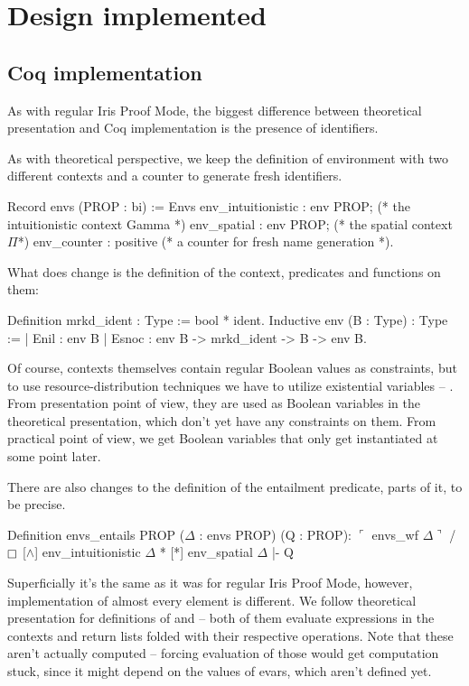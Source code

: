 {\section{Design implemented}

\subsection{Coq implementation}
\label{subsec:ipm_constr_coq_implementation}

As with regular Iris Proof Mode, the biggest difference between theoretical presentation and Coq implementation is the presence of identifiers.

As with theoretical perspective, we keep the definition of environment with two different contexts and a counter to generate fresh identifiers.
\begin{coq}
  Record envs (PROP : bi) := Envs {
    env_intuitionistic : env PROP; (* the intuitionistic context Gamma *)
    env_spatial : env PROP; (* the spatial context $\Pi$*)
    env_counter : positive (* a counter for fresh name generation *)}.
\end{coq}

What does change is the definition of the context, predicates and functions on them:
\begin{coq}
  Definition mrkd_ident : Type := bool * ident.
  Inductive env (B : Type) : Type :=
  | Enil : env B
  | Esnoc : env B -> mrkd_ident -> B -> env B.
\end{coq}

Of course, contexts themselves contain regular Boolean values as constraints, but to use resource-distribution techniques we have to utilize existential variables -- \citet[Section 2.2.1]{thecoqdevelopmentteamCoqProofAssistant2020}.
From presentation point of view, they are used as Boolean variables in the theoretical presentation, which don't yet have any constraints on them.
From practical point of view, we get Boolean variables that only get instantiated at some point later.

There are also changes to the definition of the entailment predicate, parts of it, to be precise.
\begin{coq}
  Definition envs_entails {PROP} ($\Delta$ : envs PROP) (Q : PROP):
  $\ulcorner$ envs_wf $\Delta \urcorner$ /\ $\intuit$ [$\wedge$] env_intuitionistic $\Delta$ * [*] env_spatial $\Delta$ |- Q
\end{coq}

Superficially it's the same as it was for regular Iris Proof Mode, however, implementation of almost every element is different.
We follow theoretical presentation for definitions of \coqe{$\intuit$ [$\wedge$]} and \coqe{[*]} -- both of them evaluate expressions in the contexts and return lists folded with their respective operations.
Note that these aren't actually computed -- forcing evaluation of those would get computation stuck, since it might depend on the values of evars, which aren't defined yet.

}
